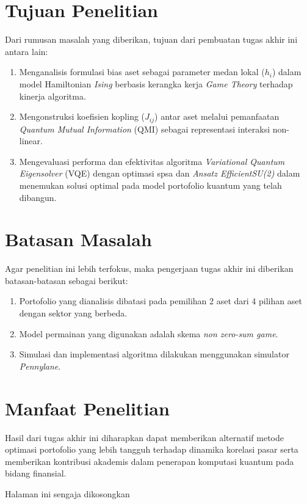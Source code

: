 \section{Tujuan Penelitian}
Dari rumusan masalah yang diberikan, tujuan dari pembuatan tugas akhir ini antara lain:
\begin{enumerate}
    \item Menganalisis formulasi bias aset sebagai parameter medan lokal ($h_i$) dalam model Hamiltonian \textit{Ising} berbasis kerangka kerja \textit{Game Theory} terhadap kinerja algoritma.
    \item Mengonstruksi koefisien kopling ($J_{ij}$) antar aset melalui pemanfaatan \textit{Quantum Mutual Information} (QMI) sebagai representasi interaksi non-linear.
    \item Mengevaluasi performa dan efektivitas algoritma \textit{Variational Quantum Eigensolver} (VQE) dengan optimasi spsa dan \textit{Ansatz EfficientSU(2)} dalam menemukan solusi optimal pada model portofolio kuantum yang telah dibangun.
\end{enumerate}

\section{Batasan Masalah}
Agar penelitian ini lebih terfokus, maka pengerjaan tugas akhir ini diberikan batasan-batasan sebagai berikut:
\begin{enumerate}
    \item Portofolio yang dianalisis dibatasi pada pemilihan 2 aset dari 4 pilihan aset dengan sektor yang berbeda.
    \item Model permainan yang digunakan adalah skema \textit{non zero-sum game}.
    \item Simulasi dan implementasi algoritma dilakukan menggunakan simulator \textit{Pennylane}.
\end{enumerate}

\section{Manfaat Penelitian}
Hasil dari tugas akhir ini diharapkan dapat memberikan alternatif metode optimasi portofolio yang lebih tangguh terhadap dinamika korelasi pasar serta memberikan kontribusi akademis dalam penerapan komputasi kuantum pada bidang finansial.

\newpage
\thispagestyle{empty}
\vspace*{\fill}
    \begin{center}
	Halaman ini sengaja dikosongkan
    \end{center}
\vspace*{\fill}
\pagebreak

